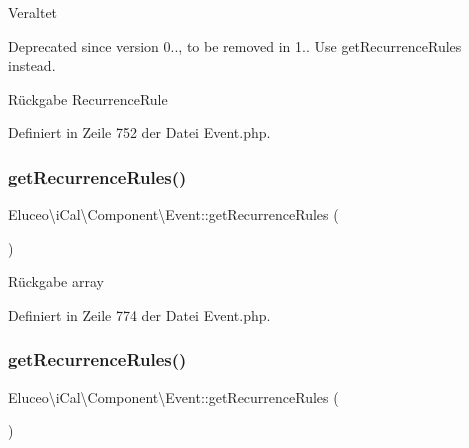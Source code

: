 \begin{DoxyRefDesc}{Veraltet}
\item[\mbox{\hyperlink{deprecated__deprecated000032}{Veraltet}}]Deprecated since version 0.., to be removed in 1.. Use get\+Recurrence\+Rules instead.\end{DoxyRefDesc}


\begin{DoxyReturn}{Rückgabe}
Recurrence\+Rule 
\end{DoxyReturn}


Definiert in Zeile 752 der Datei Event.\+php.

\mbox{\label{class_eluceo_1_1i_cal_1_1_component_1_1_event_ae16e025ea3945376ce6a73084989d998}} 
\subsubsection{\texorpdfstring{get\+Recurrence\+Rules()}{getRecurrenceRules()}\hspace{0.1cm}{\footnotesize\ttfamily [1/3]}}
{\footnotesize\ttfamily Eluceo\textbackslash{}i\+Cal\textbackslash{}\+Component\textbackslash{}\+Event\+::get\+Recurrence\+Rules (\begin{DoxyParamCaption}{ }\end{DoxyParamCaption})}

\begin{DoxyReturn}{Rückgabe}
array 
\end{DoxyReturn}


Definiert in Zeile 774 der Datei Event.\+php.

\mbox{\label{class_eluceo_1_1i_cal_1_1_component_1_1_event_ae16e025ea3945376ce6a73084989d998}} 
\subsubsection{\texorpdfstring{get\+Recurrence\+Rules()}{getRecurrenceRules()}\hspace{0.1cm}{\footnotesize\ttfamily [2/3]}}
{\footnotesize\ttfamily Eluceo\textbackslash{}i\+Cal\textbackslash{}\+Component\textbackslash{}\+Event\+::get\+Recurrence\+Rules (\begin{DoxyParamCaption}{ }\end{DoxyParamCaption})}

